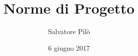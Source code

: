 


\usepackage{version}
\title{\textbf{Norme di Progetto}}
\author{Salvatore Pilò}

\date{6 giugno  2017}
\setcounter{tocdepth}{4}




\makeFrontPage


\tableofcontents
\listoftables





